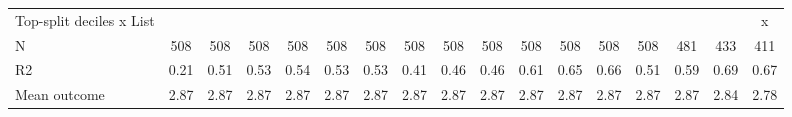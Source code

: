 \begin{tabular}{lcccccccccccccccc}
Top-split deciles x List&                     &                     &                     &                     &                     &                     &                     &                     &                     &                     &                     &                     &                     &                     &                     &           x         \\
N           &         508         &         508         &         508         &         508         &         508         &         508         &         508         &         508         &         508         &         508         &         508         &         508         &         508         &         481         &         433         &         411         \\
R2          &        0.21         &        0.51         &        0.53         &        0.54         &        0.53         &        0.53         &        0.41         &        0.46         &        0.46         &        0.61         &        0.65         &        0.66         &        0.51         &        0.59         &        0.69         &        0.67         \\
Mean outcome&        2.87         &        2.87         &        2.87         &        2.87         &        2.87         &        2.87         &        2.87         &        2.87         &        2.87         &        2.87         &        2.87         &        2.87         &        2.87         &        2.87         &        2.84         &        2.78         \\
\bottomrule \end{tabular}
